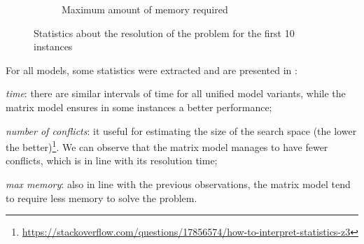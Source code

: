 \begin{figure}[h]
\begin{subfigure}{0.49\linewidth}
        \caption{Maximum amount of memory required}
    \end{subfigure}
    \caption{Statistics about the resolution of the problem for the first 10 instances}
    \label{fig:sat_plots}
\end{figure}

For all models, some statistics were extracted and are presented in :
\begin{enumerate*}[label=(\roman*)]
    \item \textit{time}: there are similar intervals of time for all unified model variants, while the matrix model ensures in some instances a better performance;
    \item \textit{number of conflicts}: it useful for estimating the size of the search space (the lower the better)\footnote{\url{https://stackoverflow.com/questions/17856574/how-to-interpret-statistics-z3}}. We can observe that the matrix model manages to have fewer conflicts, which is in line with its resolution time;
    \item \textit{max memory}: also in line with the previous observations, the matrix model tend to require less memory to solve the problem.
\end{enumerate*}
